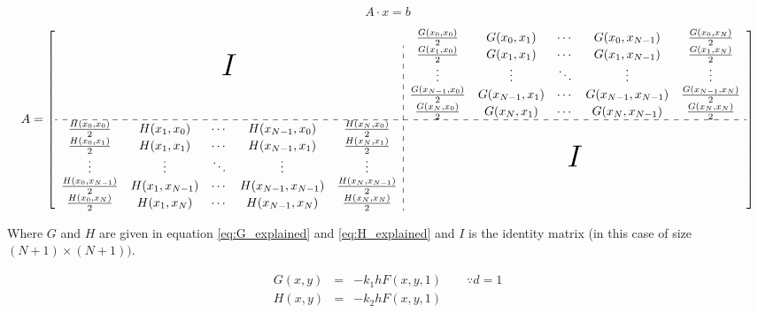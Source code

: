 \begin{equation}
A \cdot x = b
\label{eq:equationFormat}
\end{equation}

\begin{landscape}

\begin{equation}
A = 
\left[
\begin{array}{*{5}{c}:*{5}{c}}
\multicolumn{5}{c}{\multirow{5}{*}{\Huge{$I$}}} 
& \frac{G(x_0,x_0)}{2}
& G(x_0,x_1)
& \cdots
& G(x_0,x_{N-1})
& \frac{G(x_0,x_N)}{2} \\

&&&&& \frac{G(x_1,x_0)}{2}
& G(x_1,x_1) 
& \cdots
& G(x_{1},x_{N-1}) 
& \frac{G(x_{1},x_{N})}{2} \\

&&&&& \vdots
& \vdots
& \ddots
& \vdots
& \vdots\\

&&&&& \frac{G(x_{N-1},x_0)}{2}
& G(x_{N-1},x_{1}) 
& \cdots
& G(x_{N-1},x_{N-1}) 
& \frac{G(x_{N-1},x_{N})}{2} \\

&&&&& \frac{G(x_N,x_0)}{2} 
& G(x_{N},x_{1}) 
& \cdots
& G(x_{N},x_{N-1})
& \frac{G(x_{N},x_{N})}{2} \\
 \hdashline
 
\frac{H(x_0,x_0)}{2}
& H(x_1,x_0)
& \cdots
& H(x_{N-1},x_0)
& \frac{H(x_N,x_0)}{2} &
\multicolumn{5}{c}{\multirow{5}{*}{\Huge{$I$}}}
\\

\frac{H(x_0,x_1)}{2}
& H(x_1,x_1) 
& \cdots
& H(x_{N-1},x_1) 
& \frac{H(x_N,x_1)}{2} \\

\vdots
& \vdots
& \ddots
& \vdots
& \vdots\\

\frac{H(x_0,x_{N-1})}{2}
& H(x_1,x_{N-1}) 
& \cdots
& H(x_{N-1},x_{N-1}) 
& \frac{H(x_N,x_{N-1})}{2} \\

\frac{H(x_0,x_N)}{2} 
& H(x_1,x_N) 
& \cdots
& H(x_{N-1},x_{N})
& \frac{H(x_{N},x_{N})}{2} \\
\end{array}
\right]
\label{eq:A_matrix}
\end{equation}

Where $G$ and $H$ are given in equation \ref{eq:G_explained} and \ref{eq:H_explained} and $I$ is the identity matrix (in this case of size $(N+1) \times (N+1)).$

\begin{eqnarray}
G(x,y) &=&  -k_1 h F(x,y,1) \label{eq:G_explained} \qquad \because d = 1 \\
H(x,y) &=&  -k_2 h F(x,y,1)\label{eq:H_explained}
\end{eqnarray}

\end{landscape}


